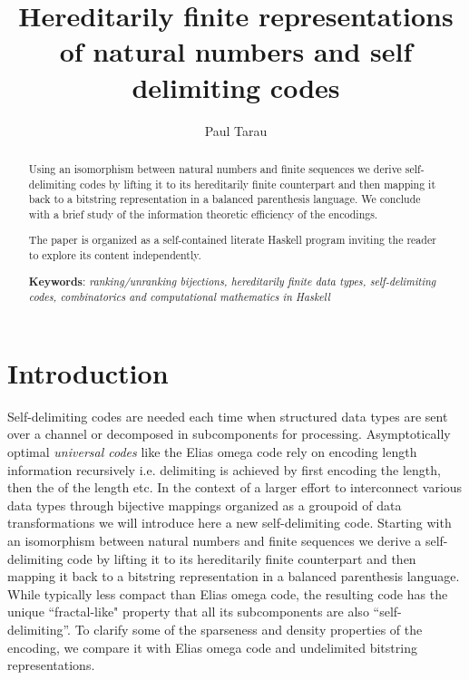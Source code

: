 \documentclass[]{INCLUDES/llncs}
\title{
   Hereditarily finite representations of natural numbers
   and self delimiting codes}
\author{Paul Tarau}
\institute{
   Department of Computer Science and Engineering\\
   University of North Texas\\
   {\em E-mail: tarau@cs.unt.edu}
}
\begin{document}
\maketitle
\date{}

\begin{abstract}
Using an isomorphism between natural numbers and
finite sequences
we derive 
self-delimiting codes by lifting it to
its hereditarily finite counterpart and then  mapping it
back to a bitstring representation in a
balanced parenthesis language. We conclude with a brief
study of the information theoretic efficiency of
the encodings. %

The paper is organized as a self-contained
literate Haskell program inviting the reader to
explore its content independently.

{\bf Keywords}:
{\em
ranking/unranking bijections,
hereditarily finite data types,
self-delimiting codes,
combinatorics and computational mathematics in Haskell
}
\end{abstract}

\begin{comment}
\begin{code}
module ISO where
import Data.List
import ISO0
\end{code}
\end{comment}

\section{Introduction}
Self-delimiting codes are needed each time when structured data types are sent
over a channel or decomposed in subcomponents for processing. Asymptotically
optimal {\em universal codes} like the Elias omega code \cite{elias75} rely on
encoding length information recursively i.e. delimiting is achieved by first
encoding the length, then the of the length etc. In the context of a larger
effort to interconnect various data types through bijective mappings organized as a groupoid of data
transformations \cite{sac09fISO,arxiv:fISO} we will introduce here a new
self-delimiting code. Starting with an isomorphism between natural numbers and
finite sequences we derive a self-delimiting code by lifting it to
its hereditarily finite counterpart and then  mapping it
back to a bitstring representation in a balanced parenthesis language.
While typically less compact than Elias omega code, the resulting code has the
unique ``fractal-like" property that all its subcomponents are also ``self-delimiting''. 
To clarify some of the sparseness and density properties of the encoding, we
compare it with Elias omega code and undelimited bitstring representations.
\end{document}

